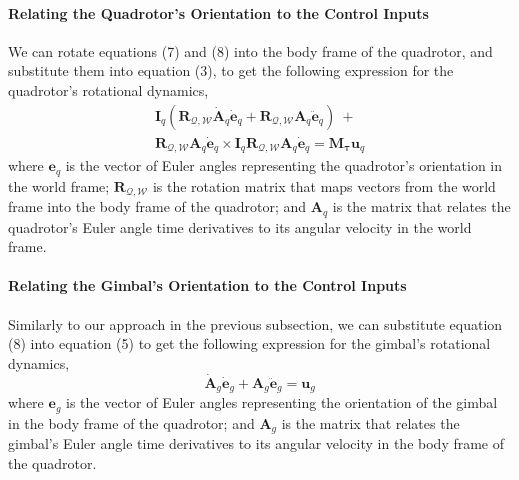 \paragraph{Relating the Quadrotor's Orientation to the Control Inputs}

We can rotate equations (7) and (8) into the body frame of the quadrotor, and substitute them into equation (3), to get the following expression for the quadrotor's rotational dynamics,       
%
\begin{equation}
\begin{aligned}
\mathbf{I}_{q} ( \mathbf{R}_{\mathcal{Q},\mathcal{W}} \dot{\mathbf{A}}_q \dot{\mathbf{e}}_q + \mathbf{R}_{\mathcal{Q},\mathcal{W}} \mathbf{A}_q \ddot{\mathbf{e}}_q ) ~ + \\
\mathbf{R}_{\mathcal{Q},\mathcal{W}} \mathbf{A}_q \dot{\mathbf{e}}_q \times \mathbf{I}_q \mathbf{R}_{\mathcal{Q},\mathcal{W}} \mathbf{A}_q \dot{\mathbf{e}}_q
=
\mathbf{M}_{\mathbf{\tau}} \mathbf{u}_q
\end{aligned}
\end{equation}
%
where
$\mathbf{e}_q$ is the vector of Euler angles representing the quadrotor's orientation in the world frame; 
$\mathbf{R}_{\mathcal{Q},\mathcal{W}}$ is the rotation matrix that maps vectors from the world frame into the body frame of the quadrotor;
and $\mathbf{A}_q$ is the matrix that relates the quadrotor's Euler angle time derivatives to its angular velocity in the world frame.

\paragraph{Relating the Gimbal's Orientation to the Control Inputs}

Similarly to our approach in the previous subsection, we can substitute equation (8) into equation (5) to get the following expression for the gimbal's rotational dynamics,       
%
\begin{equation}
\dot{\mathbf{A}}_g \dot{\mathbf{e}}_g + \mathbf{A}_g \ddot{\mathbf{e}}_g = \mathbf{u}_g
\end{equation}
%
where
$\mathbf{e}_g$ is the vector of Euler angles representing the orientation of the gimbal in the body frame of the quadrotor;
and $\mathbf{A}_g$ is the matrix that relates the gimbal's Euler angle time derivatives to its angular velocity in the body frame of the quadrotor.


